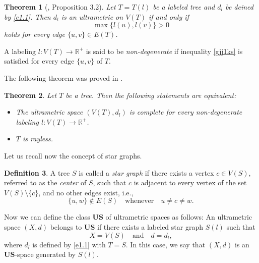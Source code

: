 \documentclass[11pt]{article}
\newtheorem{theorem}{Theorem}[section]
\theoremstyle{definition}
\newtheorem{definition}[theorem]{Definition}
\theoremstyle{remark}
\numberwithin{equation}{section}
\begin{document}
\begin{theorem}[\cite{Dov2020TaAoG}, Proposition 3.2]
\label{t1.4}
Let $T = T(l)$ be a labeled tree and $d_l $ be deined by \eqref{e1.1}. Then $d_l$ is an ultrametric on $V(T)$ if and only if
\begin{equation}\label{gjj1ks}
\max\{l(u), l(v)\} > 0
\end{equation}
holds for every edge $\{u, v\} \in E(T)$.
\end{theorem}

A labeling $l \colon V(T) \to \mathbb R^+$ is said to be \textit{non-degenerate} if inequality \eqref{gjj1ks} is satisfied for every edge $\{u,v\}$ of $T$.

The following theorem was proved in \cite{DK2022LTGCCaDUS}.

\begin{theorem}\label{rebv}
    Let $T$ be a tree. Then the following statements are equivalent:


\begin{itemize}[left=10pt]
    \item [(i)] The ultrametric space $(V(T), d_l)$ is complete for every non-degenerate labeling $l \colon V(T) \to \mathbb{R}^+$.

\item[(ii)] $T$ is rayless.
\end{itemize}

\end{theorem}

Let us recall now the concept of star graphs.






\begin{definition}
\label{wer}
A tree $S$ is called a \textit{star graph} if there exists a vertex $c \in V(S)$, referred to as the \textit{center} of $S$, such that $c$ is adjacent to every vertex of the set $V(S) \setminus \{c\}$, and no other edges exist, i.e.,
\begin{equation*}
\{u, w\} \notin E(S) \quad \text{whenever} \quad u \neq c \neq w.
\end{equation*}
\end{definition}







Now we can define the class $\mathbf{US}$ of ultrametric spaces as follows: An ultrametric space $(X, d)$ belongs to $\mathbf{US}$ if there exists a labeled star graph $S(l)$ such that
\begin{equation*}
X = V(S) \quad \text{and} \quad d = d_l,
\end{equation*}
where $d_l$ is defined by \eqref{e1.1} with $T = S$. In this case, we say that $(X, d)$ is an $\mathbf{US}$-space generated by $S(l)$.
\end{document}
